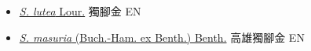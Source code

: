 \begin{itemize}
  \begin{itemize}
        \item[] \href{http://www.theplantlist.org/tpl1.1/search?q=Striga+lutea}{\textit{S. lutea} Lour.}   獨腳金   EN
        \item[] \href{http://www.theplantlist.org/tpl1.1/search?q=Striga+masuria}{\textit{S. masuria} (Buch.-Ham. ex Benth.) Benth.}   高雄獨腳金   EN
  \end{itemize}
  \end{itemize}
